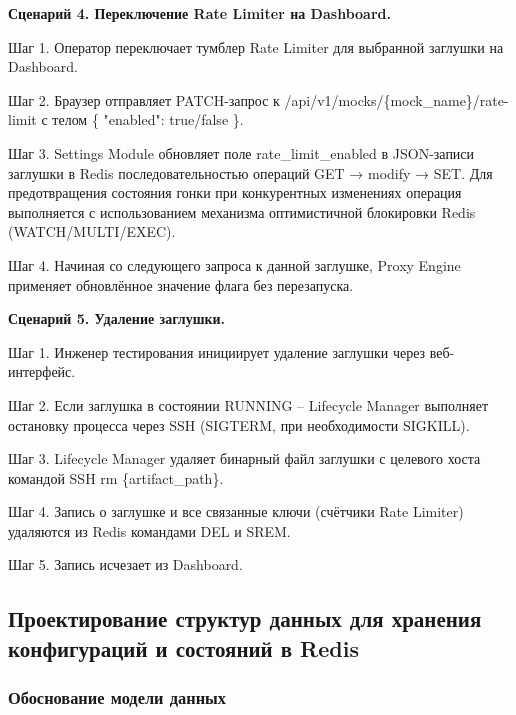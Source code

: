 \documentclass[
]{article}
\begin{document}
\textbf{Сценарий 4. Переключение Rate Limiter на Dashboard.}

Шаг 1. Оператор переключает тумблер Rate Limiter для выбранной заглушки
на Dashboard.

Шаг 2. Браузер отправляет PATCH-запрос к
/api/v1/mocks/\{mock\_name\}/rate-limit с телом \{ "enabled": true/false
\}.

Шаг 3. Settings Module обновляет поле rate\_limit\_enabled в JSON-записи
заглушки в Redis последовательностью операций GET → modify → SET. Для
предотвращения состояния гонки при конкурентных изменениях операция
выполняется с использованием механизма оптимистичной блокировки Redis
(WATCH/MULTI/EXEC).

Шаг 4. Начиная со следующего запроса к данной заглушке, Proxy Engine
применяет обновлённое значение флага без перезапуска.

\textbf{Сценарий 5. Удаление заглушки.}

Шаг 1. Инженер тестирования инициирует удаление заглушки через
веб-интерфейс.

Шаг 2. Если заглушка в состоянии RUNNING -- Lifecycle Manager выполняет
остановку процесса через SSH (SIGTERM, при необходимости SIGKILL).

Шаг 3. Lifecycle Manager удаляет бинарный файл заглушки с целевого хоста
командой SSH rm \{artifact\_path\}.

Шаг 4. Запись о заглушке и все связанные ключи (счётчики Rate Limiter)
удаляются из Redis командами DEL и SREM.

Шаг 5. Запись исчезает из Dashboard.

\subsection{Проектирование структур данных для хранения конфигураций и
состояний в
Redis}\label{ux43fux440ux43eux435ux43aux442ux438ux440ux43eux432ux430ux43dux438ux435-ux441ux442ux440ux443ux43aux442ux443ux440-ux434ux430ux43dux43dux44bux445-ux434ux43bux44f-ux445ux440ux430ux43dux435ux43dux438ux44f-ux43aux43eux43dux444ux438ux433ux443ux440ux430ux446ux438ux439-ux438-ux441ux43eux441ux442ux43eux44fux43dux438ux439-ux432-redis}

\subsubsection{Обоснование модели
данных}\label{ux43eux431ux43eux441ux43dux43eux432ux430ux43dux438ux435-ux43cux43eux434ux435ux43bux438-ux434ux430ux43dux43dux44bux445}
\end{document}
